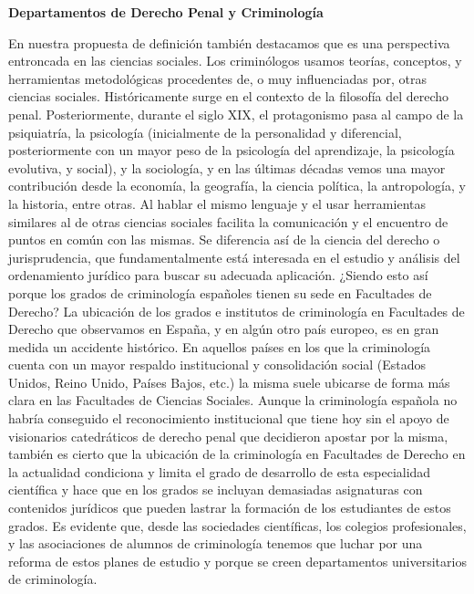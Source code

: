 \documentclass[
  spanish,
  letterpaper,
  DIV=11,
  numbers=noendperiod]{scrreprt}
\begin{document}
\begin{tcolorbox}[enhanced jigsaw, bottomtitle=1mm, toprule=.15mm, colbacktitle=quarto-callout-note-color!10!white, bottomrule=.15mm, leftrule=.75mm, colframe=quarto-callout-note-color-frame, opacitybacktitle=0.6, titlerule=0mm, breakable, colback=white, left=2mm, arc=.35mm, title=\textcolor{quarto-callout-note-color}{\faInfo}\hspace{0.5em}{Nota}, toptitle=1mm, coltitle=black, rightrule=.15mm, opacityback=0]

\textbf{Departamentos de Derecho Penal y Criminología}

En nuestra propuesta de definición también destacamos que es una
perspectiva entroncada en las ciencias sociales. Los criminólogos usamos
teorías, conceptos, y herramientas metodológicas procedentes de, o muy
influenciadas por, otras ciencias sociales. Históricamente surge en el
contexto de la filosofía del derecho penal. Posteriormente, durante el
siglo XIX, el protagonismo pasa al campo de la psiquiatría, la
psicología (inicialmente de la personalidad y diferencial,
posteriormente con un mayor peso de la psicología del aprendizaje, la
psicología evolutiva, y social), y la sociología, y en las últimas
décadas vemos una mayor contribución desde la economía, la geografía, la
ciencia política, la antropología, y la historia, entre otras. Al hablar
el mismo lenguaje y el usar herramientas similares al de otras ciencias
sociales facilita la comunicación y el encuentro de puntos en común con
las mismas. Se diferencia así de la ciencia del derecho o
jurisprudencia, que fundamentalmente está interesada en el estudio y
análisis del ordenamiento jurídico para buscar su adecuada aplicación.
¿Siendo esto así porque los grados de criminología españoles tienen su
sede en Facultades de Derecho? La ubicación de los grados e institutos
de criminología en Facultades de Derecho que observamos en España, y en
algún otro país europeo, es en gran medida un accidente histórico. En
aquellos países en los que la criminología cuenta con un mayor respaldo
institucional y consolidación social (Estados Unidos, Reino Unido,
Países Bajos, etc.) la misma suele ubicarse de forma más clara en las
Facultades de Ciencias Sociales. Aunque la criminología española no
habría conseguido el reconocimiento institucional que tiene hoy sin el
apoyo de visionarios catedráticos de derecho penal que decidieron
apostar por la misma, también es cierto que la ubicación de la
criminología en Facultades de Derecho en la actualidad condiciona y
limita el grado de desarrollo de esta especialidad científica y hace que
en los grados se incluyan demasiadas asignaturas con contenidos
jurídicos que pueden lastrar la formación de los estudiantes de estos
grados. Es evidente que, desde las sociedades científicas, los colegios
profesionales, y las asociaciones de alumnos de criminología tenemos que
luchar por una reforma de estos planes de estudio y porque se creen
departamentos universitarios de criminología.

\end{tcolorbox}
\end{document}
